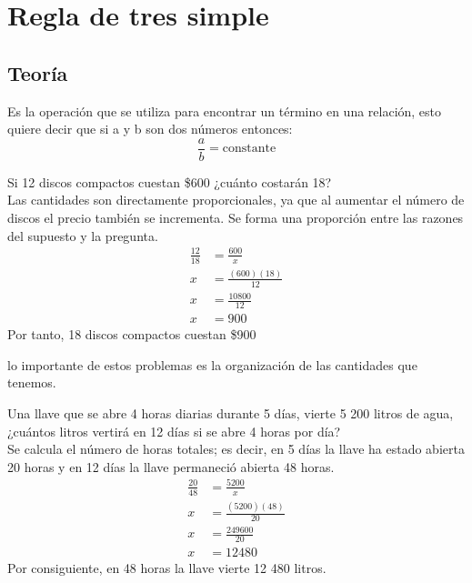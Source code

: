 \section{Regla de tres simple}
\subsection{Teoría}
Es la operación que se utiliza para encontrar un término en una relación, esto quiere decir que si a y b son dos números entonces:
\begin{equation*}
    \frac{a}{b}= \text{constante}
\end{equation*}
\begin{ejemplo}
    Si 12 discos compactos cuestan \$600 ¿cuánto costarán 18?\\
    Las cantidades son directamente proporcionales, ya que al aumentar el número de discos el precio también se
    incrementa. Se forma una proporción entre las razones del supuesto y la pregunta.
    \begin{align*}
        \frac{12}{18} & = \frac{600}{x}       \\
        x             & =\frac{(600)(18)}{12} \\
        x             & = \frac{10800}{12}    \\
        x             & = 900
    \end{align*}
    Por tanto, 18 discos compactos cuestan \$900
\end{ejemplo}
lo importante de estos problemas es la organización de las cantidades que tenemos.
\begin{ejemplo}
    Una llave que se abre 4 horas diarias durante 5 días, vierte 5 200 litros de agua, ¿cuántos litros vertirá en 12 días si se abre 4 horas por día?\\
    Se calcula el número de horas totales; es decir, en 5 días la llave ha estado abierta 20 horas y en 12 días la llave permaneció abierta 48 horas.
    \begin{align*}
        \frac{20}{48} & = \frac{5200}{x}       \\
        x             & =\frac{(5200)(48)}{20} \\
        x             & = \frac{249600}{20}    \\
        x             & = 12480
    \end{align*}
    Por consiguiente, en 48 horas la llave vierte 12 480 litros.
\end{ejemplo}
